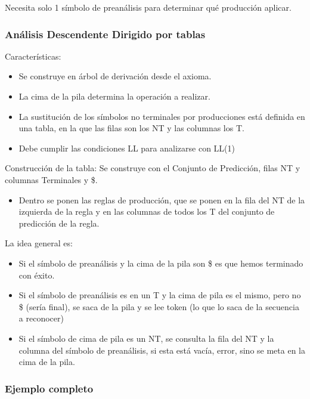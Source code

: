 \documentclass[12pt, twoside, openright]{report} %
\begin{document}
Necesita solo 1 símbolo de preanálisis para determinar qué producción
aplicar.


\subsubsection{Análisis Descendente Dirigido por tablas}

Características:

\begin{itemize}
	\item Se construye en árbol de derivación desde el axioma.
	\item La cima de la pila determina la operación a realizar.
	\item La sustitución de los símbolos no terminales por producciones está
	      definida en una tabla, en la que las filas son los NT y las columnas
	      los T.
	\item Debe cumplir las condiciones LL para analizarse con LL(1)
\end{itemize}

Construcción de la tabla: Se construye con el Conjunto de Predicción,
filas NT y columnas Terminales y \$.

\begin{itemize}
	\item Dentro se ponen las reglas de producción, que se ponen en la fila del
	      NT de la izquierda de la regla y en las columnas de todos los T del
	      conjunto de predicción de la regla.
\end{itemize}

La idea general es:

\begin{itemize}
	\item Si el símbolo de preanálisis y la cima de la pila son \$ es que hemos
	      terminado con éxito.
	\item Si el símbolo de preanálisis es en un T y la cima de pila es el mismo,
	      pero no \$ (sería final), se saca de la pila y se lee token (lo que lo
	      saca de la secuencia a reconocer)
	\item Si el símbolo de cima de pila es un NT, se consulta la fila del NT y
	      la columna del símbolo de preanálisis, si esta está vacía, error, sino
	      se meta en la cima de la pila.
\end{itemize}

\pagebreak

\subsubsection{Ejemplo completo}
\end{document}

